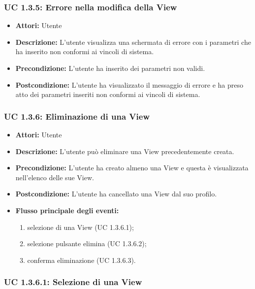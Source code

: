 \subsubsection{UC 1.3.5: Errore nella modifica della View}

\begin{itemize}
    \item \textbf{Attori:} Utente
    \item \textbf{Descrizione:} L'utente visualizza una schermata di errore con i parametri che ha inserito non conformi ai vincoli di sistema.
    \item \textbf{Precondizione:} L'utente ha inserito dei parametri non validi.
    \item \textbf{Postcondizione:} L'utente ha visualizzato il messaggio di errore e ha preso atto dei parametri inseriti non conformi ai vincoli di sistema.
\end{itemize}

\subsubsection{UC 1.3.6: Eliminazione di una View}

\begin{itemize}
    \item \textbf{Attori:} Utente
    \item \textbf{Descrizione:} L'utente può eliminare una View precedentemente creata.
    \item \textbf{Precondizione:} L'utente ha creato almeno una View e questa è visualizzata nell'elenco delle sue View.
    \item \textbf{Postcondizione:} L'utente ha cancellato una View dal suo profilo.
    \item \textbf{Flusso principale degli eventi:}

    \begin{enumerate}
        \item selezione di una View (UC 1.3.6.1);
        \item selezione pulsante elimina (UC 1.3.6.2);
        \item conferma eliminazione (UC 1.3.6.3).
    \end{enumerate}

\end{itemize}

\subsubsection{UC 1.3.6.1: Selezione di una View}

